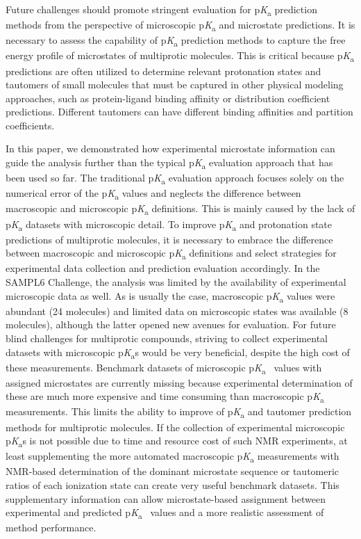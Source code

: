 \documentclass[9pt,lineno,final]{elife}
\newcommand{\pKa}{p\textit{K}\textsubscript{a}}
\begin{document}
Future challenges should promote stringent evaluation for \pKa{} prediction methods from the perspective of microscopic \pKa{} and microstate predictions.
It is necessary to assess the capability of \pKa{} prediction methods to capture the free energy profile of microstates of multiprotic molecules. 
This is critical because \pKa{} predictions are often utilized to determine relevant protonation states and tautomers of small molecules that must be captured in other physical modeling approaches, such as protein-ligand binding affinity or distribution coefficient predictions. 
Different tautomers can have different binding affinities and partition coefficients.

In this paper, we demonstrated how experimental microstate information can guide the analysis further than the typical \pKa{} evaluation approach that has been used so far. 
The traditional \pKa{} evaluation approach focuses solely on the numerical error of the \pKa{} values and neglects the difference between macroscopic and microscopic \pKa{} definitions.
This is mainly caused by the lack of \pKa{} datasets with microscopic detail. 
To improve \pKa{} and protonation state predictions of multiprotic molecules, it is necessary to embrace the difference between macroscopic and microscopic \pKa{} definitions and select strategies for experimental data collection and prediction evaluation accordingly.
In the SAMPL6 Challenge, the analysis was limited by the availability of experimental microscopic data as well. 
As is usually the case, macroscopic \pKa{} values were abundant (24 molecules) and limited data on microscopic states was available (8 molecules), although the latter opened new avenues for evaluation. 
For future blind challenges for multiprotic compounds, striving to collect experimental datasets with microscopic \pKa{}s would be very beneficial, despite the high cost of these measurements. 
Benchmark datasets of microscopic \pKa{}~ values with assigned microstates are currently missing because experimental determination of these are much more expensive and time consuming than macroscopic \pKa{} measurements. 
This limits the ability to improve of \pKa{} and tautomer prediction methods for multiprotic molecules. 
If the collection of experimental microscopic \pKa{}s is not possible due to time and resource cost of such NMR experiments, at least supplementing the more automated macroscopic \pKa{} measurements with NMR-based determination of the dominant microstate sequence or tautomeric ratios of each ionization state can create very useful benchmark datasets. 
This supplementary information can allow microstate-based assignment between experimental and predicted \pKa{}~ values and a more realistic assessment of method performance.
\end{document}
